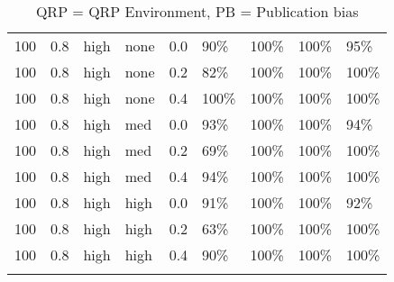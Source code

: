 \begin{longtable}{rrllrllll}
  100 & 0.8 & high & none & 0.0 & 90\% & 100\% & 100\% & 95\% \\ 
  100 & 0.8 & high & none & 0.2 & 82\% & 100\% & 100\% & 100\% \\ 
  100 & 0.8 & high & none & 0.4 & 100\% & 100\% & 100\% & 100\% \\ 
  100 & 0.8 & high & med & 0.0 & 93\% & 100\% & 100\% & 94\% \\ 
  100 & 0.8 & high & med & 0.2 & 69\% & 100\% & 100\% & 100\% \\ 
  100 & 0.8 & high & med & 0.4 & 94\% & 100\% & 100\% & 100\% \\ 
  100 & 0.8 & high & high & 0.0 & 91\% & 100\% & 100\% & 92\% \\ 
  100 & 0.8 & high & high & 0.2 & 63\% & 100\% & 100\% & 100\% \\ 
  100 & 0.8 & high & high & 0.4 & 90\% & 100\% & 100\% & 100\% \\ 
   \hline
\hline
\caption{QRP = QRP Environment, PB = Publication bias} 
\label{tab:convRate}
\end{longtable}
